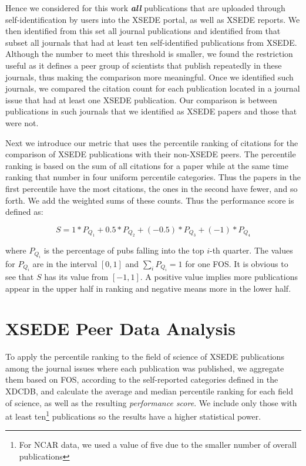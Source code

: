 \documentclass{sig-alternate}
\begin{document}
Hence we considered for this work {\em\bf all} publications that are uploaded through self-identification by users into the XSEDE portal, as well as XSEDE reports. We then identified from this set all journal publications and identified from that subset all journals that had at least ten self-identified publications from XSEDE. Although the number to meet this threshold is smaller, we found the restriction useful as it defines a peer group of scientists that publish repeatedly in these journals, thus making the comparison more meaningful. Once we identified such journals, we compared the citation count for each publication located in a journal issue that had at least one XSEDE publication. Our comparison is between publications in such journals that we identified as XSEDE papers and those that were not. 

Next we introduce our metric that uses the percentile ranking of citations for the comparison of XSEDE publications with their non-XSEDE peers. The percentile ranking is based on the sum of all citations for a paper while at the same time ranking that number in four uniform percentile categories. Thus the papers in the first percentile have the most citations, the ones in the second have fewer, and so forth.  We add the weighted sums of these counts. Thus the performance score is defined as:

\[	S = 1*P_{Q_1} + 0.5*P_{Q_2}+ (-0.5)*P_{Q_3} + (-1)*P_{Q_4} \]

where $P_{Q_i}$ is the percentage of pubs falling into the top $i$-th quarter. The values for $P_{Q_i}$ are in the interval $[0,1]$ and $\sum_{i} {P_{Q_i}} = 1$ for one FOS. It is obvious to see that $S$ has its value from $[-1, 1]$. A positive value implies more publications appear in the upper half in ranking and negative means more in the lower half. 

\section{XSEDE Peer Data Analysis}
\label{S:xsede}

To apply the percentile ranking to the field of science of XSEDE publications among the journal issues where each publication was published, we aggregate them based on FOS, according to the self-reported categories defined in the XDCDB, and calculate the average and median percentile ranking for each field of science, as well as the resulting  \emph{performance score}. We include only those with at least ten\footnote{For NCAR data, we used a value of five due to the smaller number of overall publications} publications so the results have a higher statistical power. 
\end{document}

